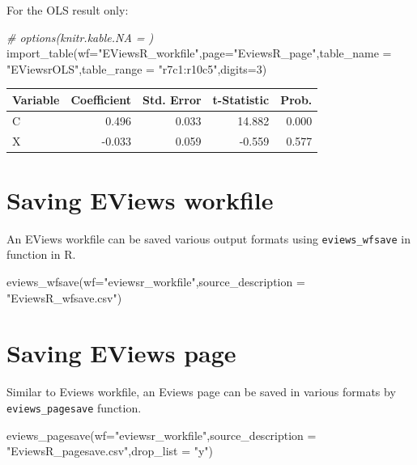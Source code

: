 \documentclass[
]{article}
\newenvironment{Shaded}{\begin{snugshade}}{\end{snugshade}}
\newcommand{\AttributeTok}[1]{\textcolor[rgb]{0.77,0.63,0.00}{#1}}
\newcommand{\CommentTok}[1]{\textcolor[rgb]{0.56,0.35,0.01}{\textit{#1}}}
\newcommand{\DecValTok}[1]{\textcolor[rgb]{0.00,0.00,0.81}{#1}}
\newcommand{\FunctionTok}[1]{\textcolor[rgb]{0.00,0.00,0.00}{#1}}
\newcommand{\NormalTok}[1]{#1}
\newcommand{\StringTok}[1]{\textcolor[rgb]{0.31,0.60,0.02}{#1}}
\begin{document}
For the OLS result only:

\begin{Shaded}
\begin{Highlighting}[]
\CommentTok{\# options(knitr.kable.NA = \textquotesingle{}\textquotesingle{})}
\FunctionTok{import\_table}\NormalTok{(}\AttributeTok{wf=}\StringTok{"EViewsR\_workfile"}\NormalTok{,}\AttributeTok{page=}\StringTok{"EviewsR\_page"}\NormalTok{,}\AttributeTok{table\_name =} \StringTok{"EViewsrOLS"}\NormalTok{,}\AttributeTok{table\_range =} \StringTok{"r7c1:r10c5"}\NormalTok{,}\AttributeTok{digits=}\DecValTok{3}\NormalTok{)}
\end{Highlighting}
\end{Shaded}

\begin{tabular}{l|r|r|r|r}
\hline
Variable & Coefficient & Std. Error & t-Statistic & Prob.\\
\hline
C & 0.496 & 0.033 & 14.882 & 0.000\\
\hline
X & -0.033 & 0.059 & -0.559 & 0.577\\
\hline
\end{tabular}

\hypertarget{saving-eviews-workfile}{%
\section{Saving EViews workfile}\label{saving-eviews-workfile}}

An EViews workfile can be saved various output formats using \texttt{eviews\_wfsave} in function in R.

\begin{Shaded}
\begin{Highlighting}[]
\FunctionTok{eviews\_wfsave}\NormalTok{(}\AttributeTok{wf=}\StringTok{"eviewsr\_workfile"}\NormalTok{,}\AttributeTok{source\_description =} \StringTok{"EviewsR\_wfsave.csv"}\NormalTok{)}
\end{Highlighting}
\end{Shaded}

\hypertarget{saving-eviews-page}{%
\section{Saving EViews page}\label{saving-eviews-page}}

Similar to Eviews workfile, an Eviews page can be saved in various formats by \texttt{eviews\_pagesave} function.

\begin{Shaded}
\begin{Highlighting}[]
\FunctionTok{eviews\_pagesave}\NormalTok{(}\AttributeTok{wf=}\StringTok{"eviewsr\_workfile"}\NormalTok{,}\AttributeTok{source\_description =} \StringTok{"EviewsR\_pagesave.csv"}\NormalTok{,}\AttributeTok{drop\_list =} \StringTok{"y"}\NormalTok{)}
\end{Highlighting}
\end{Shaded}
\end{document}
